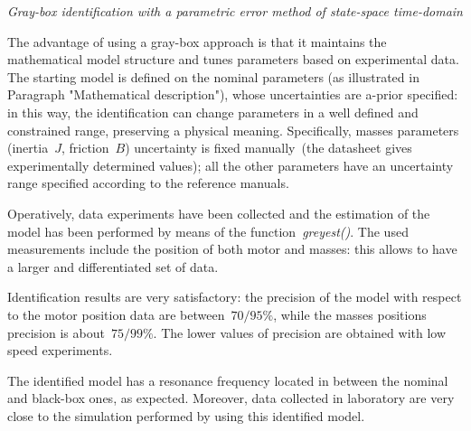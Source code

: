 \textit{Gray-box identification with a parametric error method of state-space time-domain} \\
\par The advantage of using a gray-box approach is that it maintains the mathematical model structure and tunes parameters based on experimental data. The starting model is defined on the nominal parameters (as illustrated in Paragraph "Mathematical description"), whose uncertainties are a-prior specified: in this way, the identification can change parameters in a well defined and constrained range, preserving a physical meaning. Specifically, masses parameters (inertia~$J$, friction~$B$) uncertainty is fixed manually~(the datasheet gives experimentally determined values); all the other parameters have an uncertainty range specified according to the reference manuals.

Operatively, data experiments have been collected and the estimation of the model has been performed by means of the function~\textit{greyest()}. The used measurements include the position of both motor and masses: this allows to have a larger and differentiated set of data.

Identification results are very satisfactory: the precision of the model with respect to the motor position data are between~$70 / 95\%$, while the masses positions precision is about~$75 / 99\%$. The lower values of precision are obtained with low speed experiments.

The identified model has a resonance frequency located in between the nominal and black-box ones, as expected. Moreover, data collected in laboratory are very close to the simulation performed by using this identified model.
